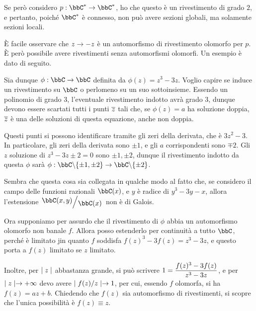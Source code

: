 Se però considero $p:\bbC^*\rar\bbC^*$, ho che questo è un rivestimento di grado $2$, e pertanto, poiché $\bbC^*$ è connesso, non può avere sezioni globali, ma solamente sezioni locali.

È facile osservare che $z\rightarrow-z$ è un automorfismo di rivestimento olomorfo per $p$. È però possibile avere rivestimenti senza automorfismi olomorfi. Un esempio è dato di seguito.

Sia dunque $\phi:\bbC\rar\bbC$ definita da $\phi(z)=z^3-3z$. Voglio capire se induce un rivestimento su $\bbC$ o perlomeno su un suo sottoinsieme.
Essendo un polinomio di grado $3$, l'eventuale rivestimento indotto avrà grado $3$, dunque devono essere scartati tutti i punti $\overline{z}$ tali che, se $\phi(z)=a$ ha soluzione doppia, $\overline{z}$ è una delle soluzioni di questa equazione, anche non doppia.

Questi punti si possono identificare tramite gli zeri della derivata, che è $3z^2-3$. In particolare, gli zeri della derivata sono $\pm1$, e gli $a$ corrispondenti sono $\mp2$. Gli $z$ soluzione di $z^3-3z\pm2=0$ sono $\pm1,\pm2$, dunque il rivestimento indotto da questa $\phi$ sarà $\phi:\bbC\minus\{\pm1,\pm2\}\rar\bbC\minus\{\pm2\}$.


Sembra che questa cosa sia collegata in qualche modo al fatto che, se considero il campo delle funzioni razionali $\bbC(x)$, e $y$ è radice di $y^3-3y-x$, allora l'estensione $\quotient{\bbC(x,y)}{\bbC(x)}$ non è di Galois.

Ora supponiamo per assurdo che il rivestimento di $\phi$ abbia un automorfismo olomorfo non banale $f$. Allora posso estenderlo per continuità a tutto $\bbC$, perché è limitato jin quanto $f$ soddisfa $f(z)^3-3f(z)=z^3-3z$, e questo porta a $f(z)$ limitato se $z$ limitato.

Inoltre, per $\mid z \mid$ abbastanza grande, si può scrivere $\displaystyle 1=\frac{f(z)^3-3f(z)}{z^3-3z}$, e per $\mid z \mid\rightarrow+\infty$ devo avere $\mid f(z)/z \mid\rightarrow1$, per cui, essendo $f$ olomorfa, si ha $f(z)=az+b$. Chiedendo che $f(z)$ sia automorfismo di rivestimenti, si scopre che l'unica possibilità è $f(z)\equiv z$.
